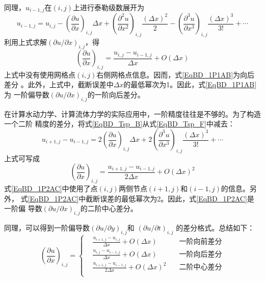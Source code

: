 同理，$u_{i-1,j}$在$(i,j)$上进行泰勒级数展开为
\begin{equation}
  u_{i-1,j}
  =
  u_{i,j} - 
  \left(
    \frac{\partial u}{\partial x}
  \right)_{i,j}
  \Delta x
  +
  \left(
    \frac{\partial^{2} u}{\partial x^{2}}
  \right)_{i,j}
  \frac{(\Delta x)^{2}}{2}
  -
  \left(
    \frac{\partial^{3} u}{\partial x^{3}}
  \right)_{i,j}
  \frac{(\Delta x)^{3}}{3!}
  +
  \cdots
  \label{EqBD_Tsp_B}
\end{equation}
利用上式求解$(\partial u/\partial x)_{i,j}$，得
\begin{equation}
  \left(
    \frac{\partial u}{\partial x}
  \right)_{i,j}
  =
  \frac{u_{i,j}-u_{i-1,j}}{\Delta x}
  +
  O(\Delta x)
  \label{EqBD_1P1AB}
\end{equation}
上式中没有使用网格点$(i,j)$右侧网格点信息。因而，式\eqref{EqBD_1P1AB}为向后差分
。此外，上式中，截断误差中$\Delta x$的最低幂次为1。因此，式\eqref{EqBD_1P1AB}为
一阶偏导数$(\partial u/\partial x)_{i,j}$的一阶向后差分。

在计算水动力学、计算流体力学的实际应用中，一阶精度往往是不够的。为了构造一个二阶
精度的差分，将式\eqref{EqBD_Tsp_B}从式\eqref{EqBD_Tsp_F}中减去：
\begin{equation}
  u_{i+1,j} - u_{i-1,j}
  =
  2
  \left(
    \frac{\partial u}{\partial x}
  \right)_{i,j}
  \Delta x
  +
  2
  \left(
    \frac{\partial^3 u}{\partial x^3}
  \right)_{i,j}
  \frac{(\Delta x)^3}{3!}
  +
  \cdots
\end{equation}
上式可写成
\begin{equation}
  \left(
    \frac{\partial u}{\partial x}
  \right)_{i,j}
  =
  \frac{u_{i+1,j} - u_{i-1,j}}{2\Delta x}
  +
  O(\Delta x)^2
  \label{EqBD_1P2AC}
\end{equation}
式\eqref{EqBD_1P2AC}中使用了点$(i,j)$两侧节点$(i+1,j)$和$(i-1,j)$的信息。另外，
式\eqref{EqBD_1P2AC}中截断误差的最低幂次为2。因此，式\eqref{EqBD_1P2AC}是一阶偏
导数$(\partial u/\partial x)_{i,j}$的二阶中心差分。

同理，可以得到一阶偏导数$(\partial u/\partial y)_{i,j}$和
$(\partial u/\partial t)_{i,j}$
的差分格式。总结如下：
\begin{equation}
  \left(
    \frac{\partial u}{\partial x}
  \right)_{i,j}
  =
  \left\{
    \begin{aligned}
      &\frac{u_{i+1,j}-u_{i,j}}{\Delta x} + O(\Delta x) & \mbox{一阶向前差分} \\
      &\frac{u_{i,j}-u_{i-1,j}}{\Delta x} + O(\Delta x) & \mbox{一阶向后差分} \\
      &\frac{u_{i+1,j}-u_{i-1,j}}{2\Delta x} + O(\Delta x)^{2} \quad& \mbox{二阶中心差分} \\
    \end{aligned}
  \right.
\end{equation}

